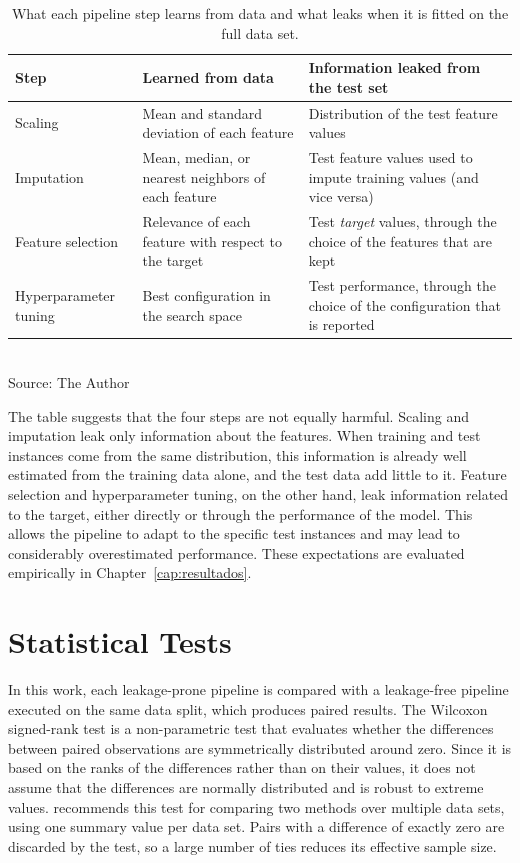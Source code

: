 \begin{table}[htb]
\centering
\caption{What each pipeline step learns from data and what leaks when it is fitted on the full data set.}
\label{tab:fontes-vazamento}
\small
\begin{tabular}{p{2.6cm}p{5.0cm}p{6.2cm}}
\toprule
\textbf{Step} & \textbf{Learned from data} & \textbf{Information leaked from the test set} \\
\midrule
Scaling & Mean and standard deviation of each feature & Distribution of the test feature values \\
Imputation & Mean, median, or nearest neighbors of each feature & Test feature values used to impute training values (and vice versa) \\
Feature selection & Relevance of each feature with respect to the target & Test \emph{target} values, through the choice of the features that are kept \\
Hyperparameter tuning & Best configuration in the search space & Test performance, through the choice of the configuration that is reported \\
\bottomrule
\end{tabular}
\\[2pt]
\footnotesize Source: The Author
\end{table}

The table suggests that the four steps are not equally harmful. Scaling and
imputation leak only information about the features. When training and test
instances come from the same distribution, this information is already well
estimated from the training data alone, and the test data add little to it.
Feature selection and hyperparameter tuning, on the other hand, leak information
related to the target, either directly or through the performance of the model.
This allows the pipeline to adapt to the specific test instances and may lead to
considerably overestimated performance. These expectations are evaluated
empirically in Chapter~\ref{cap:resultados}.

\section{Statistical Tests}
\label{sec:fund-estatistica}

In this work, each leakage-prone pipeline is compared with a leakage-free
pipeline executed on the same data split, which produces paired results. The
Wilcoxon signed-rank test \cite{wilcoxon1945} is a non-parametric test that
evaluates whether the differences between paired observations are
symmetrically distributed around zero. Since it is based on the ranks of the
differences rather than on their values, it does not assume that the differences
are normally distributed and is robust to extreme values. 
recommends this test for comparing two methods over multiple data sets, using
one summary value per data set. Pairs with a difference of exactly zero are
discarded by the test, so a large number of ties reduces its effective sample
size.

